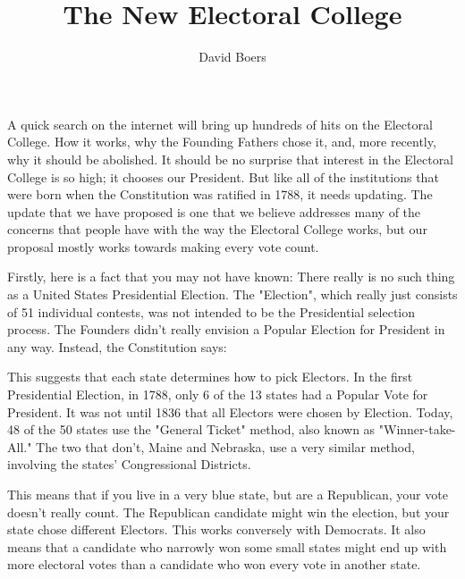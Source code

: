 \documentclass{article}
\title{The New Electoral College}
\author{David Boers}
\begin{document}
    \maketitle
    A quick search on the internet will bring up hundreds of hits on the Electoral College. How it works, why the Founding Fathers chose it, and, 
    more recently, why it should be abolished. It should be no surprise that interest in the Electoral College is so high; it chooses our President. 
    But like all of the institutions that were born when the Constitution was ratified in 1788, it needs updating. The update that we have proposed is 
    one that we believe addresses many of the concerns that people have with the way the Electoral College works, but our proposal mostly works towards 
    making every vote count.

    Firstly, here is a fact that you may not have known: There really is no such thing as a United States Presidential Election. The "Election", which 
    really just consists of 51 individual contests, was not intended to be the Presidential selection process. The Founders didn’t really envision a 
    Popular Election for President in any way. Instead, the Constitution says:


    This suggests that each state determines how to pick Electors. In the first Presidential Election, in 1788, only 6 of the 13 states had a Popular Vote 
    for President. It was not until 1836 that all Electors were chosen by Election. Today, 48 of the 50 states use the "General Ticket" method, also known 
    as "Winner-take-All." The two that don't, Maine and Nebraska, use a very similar method, involving the states' Congressional Districts.

    This means that if you live in a very blue state, but are a Republican, your vote doesn't really count. The Republican candidate might win the 
    election, but your state chose different Electors. This works conversely with Democrats. It also means that a candidate who narrowly won some small 
    states might end up with more electoral votes than a candidate who won every vote in another state.
\end{document}
